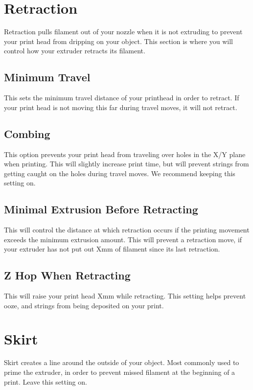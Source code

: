 \section{Retraction}
Retraction pulls filament out of your nozzle when it is not extruding to prevent your print head from dripping on your object. This section is where you will control how your extruder retracts its filament.

\subsection{Minimum Travel}
This sets the minimum travel distance of your printhead in order to retract. If your print head is not moving this far during travel moves, it will not retract.

\subsection{Combing}
This option prevents your print head from traveling over holes in the X/Y plane when printing. This will slightly increase print time, but will prevent strings from getting caught on the holes during travel moves. We recommend keeping this setting on.

\subsection{Minimal Extrusion Before Retracting}
This will control the distance at which retraction occurs if the printing movement exceeds the minimum extrusion amount. This will prevent a retraction move, if your extruder has not put out Xmm of filament since its last retraction.

\subsection{Z Hop When Retracting}
This will raise your print head Xmm while retracting. This setting helps prevent ooze, and strings from being deposited on your print. 

\section{Skirt}
Skirt creates a line around the outside of your object. Most commonly used to prime the extruder, in order to prevent missed filament at the beginning of a print. Leave this setting on.

